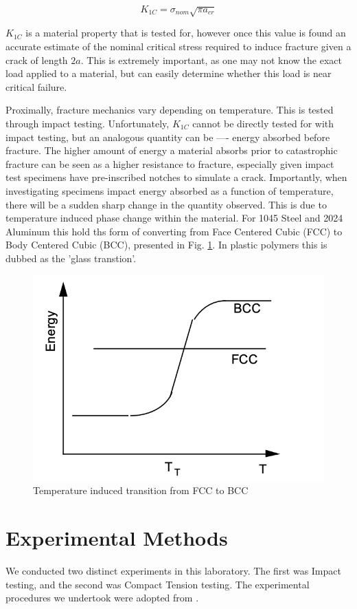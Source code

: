 \documentclass{article}
\begin{document}
\begin{equation}
    K_{1C} = \sigma_{nom}\sqrt{\pi a_{cr}}
\end{equation}

$K_{1C}$ is a material property that is tested for, however once this value is found an accurate estimate of the nominal critical stress required to induce fracture given a crack of length $2a$. This is extremely important, as one may not know the exact load applied to a material, but can easily determine whether this load is near critical failure.

Proximally, fracture mechanics vary depending on temperature. This is tested through impact testing. Unfortunately, $K_{1C}$ cannot be directly tested for with impact testing, but an analogous quantity can be ---- energy absorbed before fracture. The higher amount of energy a material absorbs prior to catastrophic fracture can be seen as a higher resistance to fracture, especially given impact test specimens have pre-inscribed notches to simulate a crack. Importantly, when investigating specimens impact energy absorbed as a function of temperature, there will be a sudden sharp change in the quantity observed. This is due to temperature induced phase change within the material. For 1045 Steel and 2024 Aluminum this hold ths form of converting from Face Centered Cubic (FCC) to Body Centered Cubic (BCC), presented in Fig. \ref{fig:bccfcc}. In plastic polymers this is dubbed as the 'glass transtion'.

\begin{figure}[!h!]
    \centering
    \includegraphics[width=0.5\linewidth]{plots/bccfcc.png}
    \caption{Temperature induced transition from FCC to BCC}
    \label{fig:bccfcc}
\end{figure}

\section{Experimental Methods}
We conducted two distinct experiments in this laboratory. The first was Impact testing, and the second was Compact Tension testing. The experimental procedures we undertook were adopted from \cite{manual}. 
\end{document}
